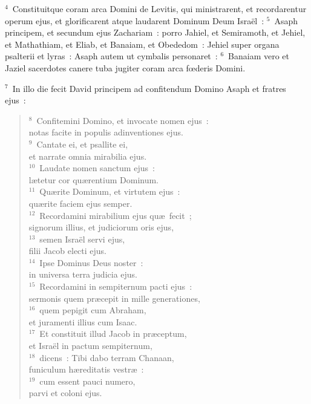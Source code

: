 ${}^{4}$~Constituitque coram arca Domini de Levitis, qui ministrarent, et recordarentur operum ejus, et glorificarent atque laudarent Dominum Deum Isra\"el~:
${}^{5}$~Asaph principem, et secundum ejus Zachariam~: porro Jahiel, et Semiramoth, et Jehiel, et Mathathiam, et Eliab, et Banaiam, et Obededom~: Jehiel super organa psalterii et lyras~: Asaph autem ut cymbalis personaret~:
${}^{6}$~Banaiam vero et Jaziel sacerdotes canere tuba jugiter coram arca fœderis Domini.


${}^{7}$~In illo die fecit David principem ad confitendum Domino Asaph et fratres ejus~:
\begin{flushleft}\begin{verse}${}^{8}$~Confitemini Domino, et invocate nomen ejus~:\\ notas facite in populis adinventiones ejus.\\
${}^{9}$~Cantate ei, et psallite ei,\\ et narrate omnia mirabilia ejus.\\
${}^{10}$~Laudate nomen sanctum ejus~:\\ l\ae tetur cor qu\ae rentium Dominum.\\
${}^{11}$~Qu\ae rite Dominum, et virtutem ejus~:\\ qu\ae rite faciem ejus semper.\\
${}^{12}$~Recordamini mirabilium ejus qu\ae\ fecit~;\\ signorum illius, et judiciorum oris ejus,\\
${}^{13}$~semen Isra\"el servi ejus,\\ filii Jacob electi ejus.\\
${}^{14}$~Ipse Dominus Deus noster~:\\ in universa terra judicia ejus.\\
${}^{15}$~Recordamini in sempiternum pacti ejus~:\\ sermonis quem pr\ae cepit in mille generationes,\\
${}^{16}$~quem pepigit cum Abraham,\\ et juramenti illius cum Isaac.\\
${}^{17}$~Et constituit illud Jacob in pr\ae ceptum,\\ et Isra\"el in pactum sempiternum,\\
${}^{18}$~dicens~: Tibi dabo terram Chanaan,\\ funiculum h\ae reditatis vestr\ae~:\\
${}^{19}$~cum essent pauci numero,\\ parvi et coloni ejus.\\

\end{verse}
\end{flushleft}
